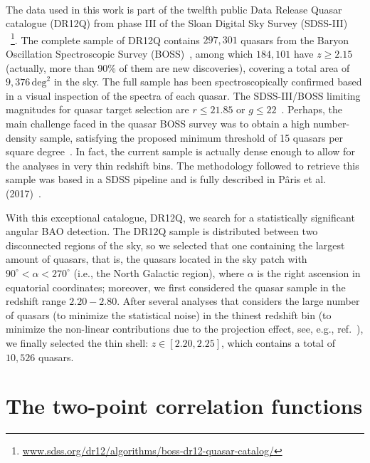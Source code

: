 \documentclass[a4paper,11pt]{article}
\begin{document}
\paragraph{}
The data used in this work is part of the twelfth public Data Release Quasar catalogue (DR12Q) 
from phase III of the Sloan Digital Sky Survey (SDSS-III)~\cite{Eisenstein2011}
~\footnote{\url{www.sdss.org/dr12/algorithms/boss-dr12-quasar-catalog/}}. 
The complete sample of DR12Q contains $297,301$ quasars from the Baryon Oscillation Spectroscopic 
Survey (BOSS)~\cite{Dawson2013}, among which $184,101$ have $z \ge 2.15$ (actually, more than 
90\% of them are new discoveries), covering a total area of $9,376 \, \mbox{deg}^{2}$ in the sky. 
The full sample has been spectroscopically confirmed based in a visual inspection of the spectra of 
each quasar. 
The SDSS-III/BOSS limiting magnitudes for quasar target selection are $r \le 21.85$ or 
$g \le 22$~\cite{Paris}. 
Perhaps, the main challenge faced in the quasar BOSS survey was to obtain a high number-density 
sample, satisfying the proposed minimum threshold of 15 quasars per square degree~\cite{Paris}. 
In fact, the current sample is actually dense enough to allow for the analyses in very thin redshift 
bins. 
The methodology followed to retrieve this sample was based in a SDSS pipeline and is fully 
described in P\^aris et al. (2017)~\cite{Paris}. 


With this exceptional catalogue, DR12Q, we search for a statistically significant angular BAO 
detection. 
The DR12Q sample is distributed between two disconnected regions of the sky, 
so we selected that one containing the largest amount of quasars, that is, the quasars located in the 
sky patch with $90^{\circ} < \alpha < 270^{\circ}$ (i.e., the North Galactic region), where $\alpha$ 
is the right ascension in equatorial coordinates; moreover, we first considered the quasar sample in 
the redshift range $2.20 - 2.80$. 
After several analyses that considers the large number of quasars (to minimize the statistical noise) 
in the thinest redshift bin (to minimize the non-linear contributions due to the projection effect, see, 
e.g., ref.~\cite{Sanchez11}), 
we finally selected the thin shell: $z \in [2.20, 2.25]$, which contains a total of $10,526$ quasars. 


\section{\label{sec3} The two-point correlation functions}
\end{document}
